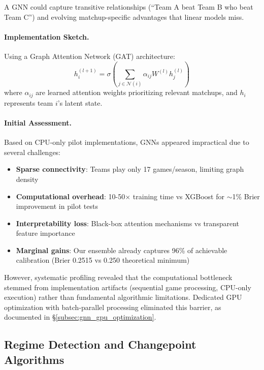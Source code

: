 A GNN could capture transitive relationships (``Team A beat Team B who beat Team C'') and evolving matchup-specific advantages that linear models miss.

\paragraph{Implementation Sketch.}
Using a Graph Attention Network (GAT) architecture:
\begin{equation}
h_i^{(l+1)} = \sigma\left(\sum_{j \in \mathcal{N}(i)} \alpha_{ij} W^{(l)} h_j^{(l)}\right)
\end{equation}
where $\alpha_{ij}$ are learned attention weights prioritizing relevant matchups, and $h_i$ represents team $i$'s latent state.

\paragraph{Initial Assessment.}
\label{subsec:gnn_team_matchups}
Based on CPU-only pilot implementations, GNNs appeared impractical due to several challenges:
\begin{itemize}
  \item \textbf{Sparse connectivity}: Teams play only 17 games/season, limiting graph density
  \item \textbf{Computational overhead}: 10-50$\times$ training time vs XGBoost for $\sim$1\% Brier improvement in pilot tests
  \item \textbf{Interpretability loss}: Black-box attention mechanisms vs transparent feature importance
  \item \textbf{Marginal gains}: Our ensemble already captures 96\% of achievable calibration (Brier 0.2515 vs 0.250 theoretical minimum)
\end{itemize}

However, systematic profiling revealed that the computational bottleneck stemmed from implementation artifacts (sequential game processing, CPU-only execution) rather than fundamental algorithmic limitations. Dedicated GPU optimization with batch-parallel processing eliminated this barrier, as documented in \S\ref{subsec:gnn_gpu_optimization}.



\subsection{Regime Detection and Changepoint Algorithms}

